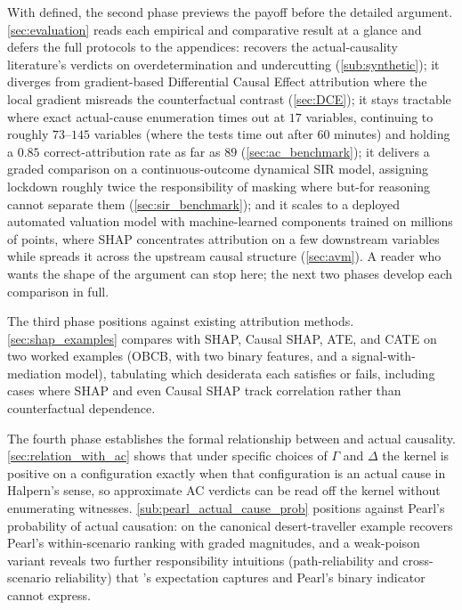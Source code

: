 With \ourapproach defined, the second phase previews the payoff before the
detailed argument. \cref{sec:evaluation} reads each empirical and comparative
result at a glance and defers the full protocols to the appendices:
\ourapproach recovers the actual-causality literature's verdicts on
overdetermination and undercutting (\cref{sub:synthetic}); it diverges from
gradient-based Differential Causal Effect attribution where the local gradient
misreads the counterfactual contrast (\cref{sec:DCE}); it stays tractable where
exact actual-cause enumeration times out at $17$ variables, continuing to
roughly $73$--$145$ variables (where the tests time out after 60 minutes) and holding a $0.85$ correct-attribution rate as
far as $89$
(\cref{sec:ac_benchmark}); it delivers a graded comparison on a
continuous-outcome dynamical SIR model, assigning lockdown roughly twice the
responsibility of masking where but-for reasoning cannot separate them
(\cref{sec:sir_benchmark}); and it scales to a deployed automated valuation
model with machine-learned components trained on millions of points, where SHAP
concentrates attribution on a few downstream variables while \ourapproach
spreads it across the upstream causal structure (\cref{sec:avm}). A reader who
wants the shape of the argument can stop here; the next two phases develop each
comparison in full.

The third phase positions \ourapproach against existing attribution methods.
\cref{sec:shap_examples} compares \ourapproach with SHAP, Causal SHAP, ATE, and
CATE on two worked examples (OBCB, with two binary features, and a
signal-with-mediation model), tabulating which desiderata each satisfies or
fails, including cases where SHAP and even Causal SHAP track correlation rather than
counterfactual dependence.

The fourth phase establishes the formal relationship between \ourapproach and
actual causality. \cref{sec:relation_with_ac} shows that under specific choices of
$\Gamma$ and $\Delta$ the \ourapproach kernel is positive on a configuration
exactly when that configuration is an actual cause in Halpern's sense, so
approximate AC verdicts can be read off the kernel without enumerating witnesses.
\cref{sub:pearl_actual_cause_prob} positions \ourapproach against Pearl's
probability of actual causation: on the canonical desert-traveller example
\ourapproach recovers Pearl's within-scenario ranking with graded magnitudes, and
a weak-poison variant reveals two further responsibility intuitions
(path-reliability and cross-scenario reliability) that \ourapproach's expectation
captures and Pearl's binary indicator cannot express.

